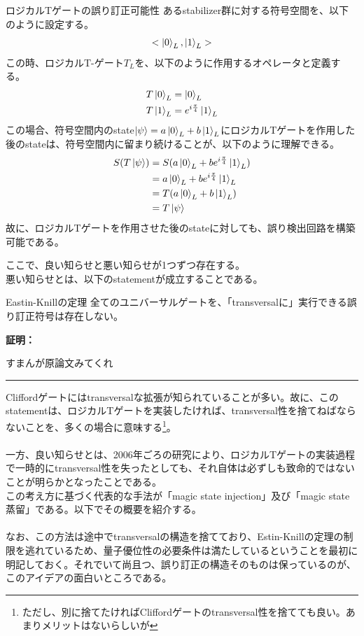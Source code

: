 \documentclass[a4paper,10.5pt]{article}
\numberwithin{equation}{section}
\newenvironment{proofbox}
{\begin{prooflabel}\textbf{証明：}\end{prooflabel}\vspace{0.8em}}
{\par\vspace{1em}\hrule\vspace{1em}}
\begin{document}
\begin{setupbox}{ロジカルTゲートの誤り訂正可能性}
あるstabilizer群に対する符号空間を、以下のように設定する。
\begin{align*}
    <\ket{0}_{L},\ket{1}_{L}>
\end{align*}
この時、ロジカルT-ゲート$T_{L}$を、以下のように作用するオペレータと定義する。
\begin{align*}
    &T\ket{0}_{L}=\ket{0}_{L}\\
    &T\ket{1}_{L}=e^{i\frac{\pi}{4}}\ket{1}_{L}
\end{align*}
この場合、符号空間内のstate$\ket{\psi}=a\ket{0}_{L}+b\ket{1}_{L}$にロジカルTゲートを作用した後のstateは、符号空間内に留まり続けることが、以下のように理解できる。
\begin{align*}
    S(T\ket{\psi})&=S(a\ket{0}_{L}+be^{i\frac{\pi}{4}}\ket{1}_{L})\\
    &=a\ket{0}_{L}+be^{i\frac{\pi}{4}}\ket{1}_{L}\\
    &=T(a\ket{0}_{L}+b\ket{1}_{L})\\
    &=T\ket{\psi}
\end{align*}
故に、ロジカルTゲートを作用させた後のstateに対しても、誤り検出回路を構築可能である。
\end{setupbox}
ここで、良い知らせと悪い知らせが1つずつ存在する。\\
悪い知らせとは、以下のstatementが成立することである。
\begin{theorembox}{Eastin-Knillの定理}
    全てのユニバーサルゲートを、「transversalに」実行できる誤り訂正符号は存在しない。
\end{theorembox}
\begin{proofbox}
    すまんが原論文みてくれ
\end{proofbox}
Cliffordゲートにはtransversalな拡張が知られていることが多い。故に、このstatementは、ロジカルTゲートを実装したければ、transversal性を捨てねばならないことを、多くの場合に意味する\footnote{ただし、別に捨てたければCliffordゲートのtransversal性を捨てても良い。あまりメリットはないらしいが}。\\
\\
一方、良い知らせとは、2006年ごろの研究により、ロジカルTゲートの実装過程で一時的にtransversal性を失ったとしても、それ自体は必ずしも致命的ではないことが明らかとなったことである。\\
この考え方に基づく代表的な手法が「magic state injection」及び「magic state蒸留」である。以下でその概要を紹介する。\\
\\
なお、この方法は途中でtransversalの構造を捨てており、Estin-Knillの定理の制限を逃れているため、量子優位性の必要条件は満たしているということを最初に明記しておく。それでいて尚且つ、誤り訂正の構造そのものは保っているのが、このアイデアの面白いところである。
\end{document}
